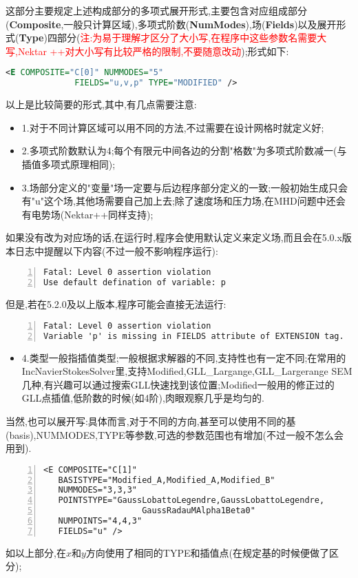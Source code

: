这部分主要规定上述构成部分的多项式展开形式,主要包含对应组成部分(\textbf{Composite},一般只计算区域),多项式阶数(\textbf{NumModes}),场(\textbf{Fields})以及展开形式(\textbf{Type})四部分(\textcolor{red}{注:为易于理解才区分了大小写,在程序中这些参数名需要大写,Nektar ++对大小写有比较严格的限制,不要随意改动});形式如下:
\par
\begin{lstlisting}[frame=single,language=XML]
   <E COMPOSITE="C[0]" NUMMODES="5" 
	          FIELDS="u,v,p" TYPE="MODIFIED" />
\end{lstlisting}
\par
以上是比较简要的形式,其中,有几点需要注意:
\begin{itemize}
\item{1.对于不同计算区域可以用不同的方法,不过需要在设计网格时就定义好;}
\item{2.多项式阶数默认为4;每个有限元中间各边的分割"格数"为多项式阶数减一(与插值多项式原理相同);}
\item{3.场部分定义的"变量"场一定要与后边程序部分定义的一致;一般初始生成只会有"u"这个场,其他场需要自己加上去;除了速度场和压力场,在MHD问题中还会有电势场(Nektar++同样支持);}
\end{itemize}
\par
如果没有改为对应场的话,在运行时,程序会使用默认定义来定义场,而且会在5.0.x版本日志中提醒以下内容(不过一般不影响程序运行):
\begin{lstlisting}[frame=single,numbers=left]
Fatal: Level 0 assertion violation
Use default defination of variable: p
\end{lstlisting}
\par
但是,若在5.2.0及以上版本,程序可能会直接无法运行:
\begin{lstlisting}[frame=single,numbers=left]
Fatal: Level 0 assertion violation
Variable 'p' is missing in FIELDS attribute of EXTENSION tag.
\end{lstlisting}
\par

\begin{itemize}
\item{4.类型一般指插值类型;一般根据求解器的不同,支持性也有一定不同;在常用的IncNavierStokesSolver里,支持Modified,GLL\_Largange,GLL\_Largerange SEM几种,有兴趣可以通过搜索GLL快速找到该位置;Modified一般用的修正过的GLL点插值,低阶数的时候(如4阶),肉眼观察几乎是均匀的.}
\end{itemize}

当然,也可以展开写:具体而言,对于不同的方向,甚至可以使用不同的基(basis),NUMMODES,TYPE等参数,可选的参数范围也有增加(不过一般不怎么会用到).
\begin{lstlisting}[frame=single,numbers=left]
<E COMPOSITE="C[1]"
   BASISTYPE="Modified_A,Modified_A,Modified_B"
   NUMMODES="3,3,3"
   POINTSTYPE="GaussLobattoLegendre,GaussLobattoLegendre,
   		   		    GaussRadauMAlpha1Beta0"
   NUMPOINTS="4,4,3"
   FIELDS="u" />
\end{lstlisting}
\par
如以上部分,在$x$和$y$方向使用了相同的TYPE和插值点(在规定基的时候便做了区分);


